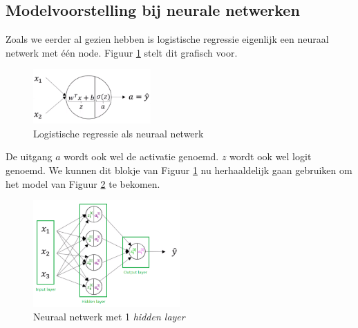 \subsection{Modelvoorstelling bij neurale netwerken}

Zoals we eerder al gezien hebben is logistische regressie eigenlijk een neuraal netwerk met één node. Figuur \ref{fig:neural-network-model-log-reg} stelt dit grafisch voor. 

\begin{figure}[h]
	\centering
	\includegraphics[width=0.4\textwidth]{images/13-neural-network-model-log-reg.png}
	\caption{Logistische regressie als neuraal netwerk}
	\label{fig:neural-network-model-log-reg}
\end{figure}
\noindent
De uitgang $a$ wordt ook wel de activatie genoemd. $z$ wordt ook wel logit genoemd. We kunnen dit blokje van Figuur \ref{fig:neural-network-model-log-reg} nu herhaaldelijk gaan gebruiken om het model van Figuur \ref{fig:neural-network-model-1} te bekomen. 

\begin{figure}[h]
	\centering
	\includegraphics[width=0.5\textwidth]{images/14-neural-network-model-1.png}
	\caption{Neuraal netwerk met 1 \textit{hidden layer}}
	\label{fig:neural-network-model-1}
\end{figure}

